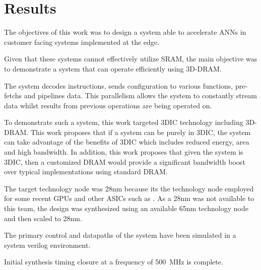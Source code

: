 \documentclass[journal]{IEEEtran}
\begin{document}
\section{Results}
\label{sec:Results}
The objectives of this work was to design a system able to accelerate ANNs in customer facing systems implemented at the edge. 

Given that these systems cannot effectively utilize SRAM, the main objective was to demonstrate a system that can operate efficiently using 3D-DRAM.

The system decodes instructions, sends configuration to various functions, pre-fetchs and pipelines data.
This parallelism allows the system to constantly stream data whilst results from previous operations are being operated on.

To demonstrate such a system, this work targeted 3DIC technology including 3D-DRAM. This work proposes that if a system can be purely in 3DIC, the system can take advantage of the benefits
of 3DIC which includes reduced energy, area and high bandwidth.
In addition, this work proposes that given the system is 3DIC, then a customized DRAM would provide a significant bandwidth boost over typical implementations using standard DRAM.

The target technology node was 28nm because its the technology node employed for some recent GPUs and other ASICs such as \cite{jouppi2017datacenter}.
As a 28nm was not available to this team, the design was synthesized using an available 65nm technology node and then scaled to 28nm.

The primary control and datapaths of the system have been simulated in a system verilog environment. 

Initial synthesis timing closure at a frequency of \SI{500}{\mega\hertz} is complete.

\end{document}

